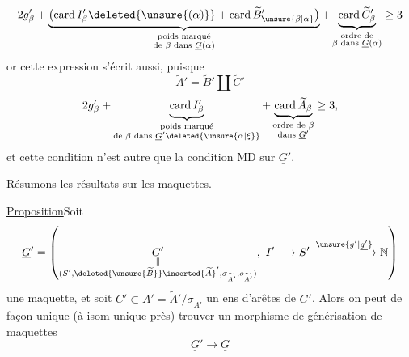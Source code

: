 \[
2g'_\beta+\underbrace{\bigl(\operatorname{card}I'_\beta\deleted{\unsure{(\alpha)}}+\operatorname{card}\widetilde B'_{\unsure{\beta|\alpha}}\bigr)}_{\substack{\text{poids marqué}\\\text{de }\beta\text{ dans }\underline G(\alpha)}}+\underbrace{\operatorname{card}\widetilde C'_\beta}_{\substack{\text{ordre de}\\\beta\text{ dans }\underline G(\alpha)}}\geq3
\]
or cette expression s'écrit aussi, puisque
\[
\widetilde A'=\widetilde B'\amalg\widetilde C'
\]
\[
2g'_\beta+\underbrace{\operatorname{card}I'_\beta}_{\substack{\text{poids marqué}\\\text{de }\beta\text{ dans }\underline G'\deleted{\unsure{\alpha|\xi}}}}+\underbrace{\operatorname{card}\widetilde A_\beta}_{\substack{\text{ordre de }\beta\\\text{dans }\underline G'}}\geq3,
\]
et cette condition n'est autre que la condition  MD sur $\underline G'$.

Résumons les résultats sur les maquettes.

\uline{Proposition}\quad Soit
\[
\underline G'=\left(\underset{\substack{\Vert\\(S',\deleted{\unsure{\widetilde B}}\inserted{\widetilde A}',\sigma_{\widetilde A'},o_{\widetilde A'})}}{G'},\ I'\longrightarrow S'\xrightarrow{\unsure{g'|\underline{g'}}}\mathbb N\right)
\]
une maquette, et soit $C'\subset A'=\widetilde A'/\sigma_{\widetilde A'}$ un ens d'arêtes de $G'$. Alors on peut de façon unique  (à isom unique près) trouver un morphisme de générisation de maquettes
\[
\underline G'\longrightarrow\underline G
\]
